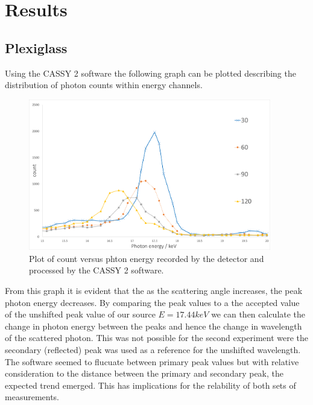 \documentclass{article}%
\begin{document}
\section{Results}
\subsection{Plexiglass}
Using the CASSY 2 software the following graph can be plotted describing the distribution of photon counts within energy channels.

\begin{figure}[H]
    \centering%
    \includegraphics[width=400px]{plexi_plot.png}
    \caption{Plot of count versus phton energy recorded by the detector and processed by the CASSY 2 software.}%
\end{figure}

From this graph it is evident that the as the scattering angle increases, the peak photon energy decreases. By comparing the peak values to a the accepted value of the unshifted peak value of our source $E=17.44 keV$ we can then calculate the change in photon energy between the peaks and hence the change in wavelength of the scattered photon.
This was not possible for the second experiment were the secondary (reflected) peak was used as a reference for the unshifted wavelength. The software seemed to flucuate between primary peak values but with relative consideration to the distance between the primary and secondary peak, the expected trend emerged.
This has implications for the relability of both sets of measurements.
\end{document}
